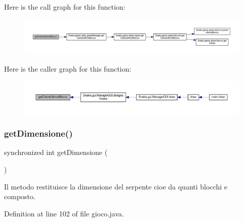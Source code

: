 Here is the call graph for this function\+:
\nopagebreak
\begin{figure}[H]
\begin{center}
\leavevmode
\includegraphics[width=350pt]{class_snake_1_1game_1_1gioco_aa28f45b4849720b24778146d20f7be0b_cgraph}
\end{center}
\end{figure}
Here is the caller graph for this function\+:
\nopagebreak
\begin{figure}[H]
\begin{center}
\leavevmode
\includegraphics[width=350pt]{class_snake_1_1game_1_1gioco_aa28f45b4849720b24778146d20f7be0b_icgraph}
\end{center}
\end{figure}
\mbox{\label{class_snake_1_1game_1_1gioco_af0072e81eee8ca6f1aadbda23fa837c7}} 
\subsubsection{\texorpdfstring{get\+Dimensione()}{getDimensione()}}
{\footnotesize\ttfamily synchronized int get\+Dimensione (\begin{DoxyParamCaption}{ }\end{DoxyParamCaption})}



Il metodo restituisce la dimensione del serpente cioe\textquotesingle{} da quanti blocchi e\textquotesingle{} composto. 



Definition at line 102 of file gioco.\+java.

